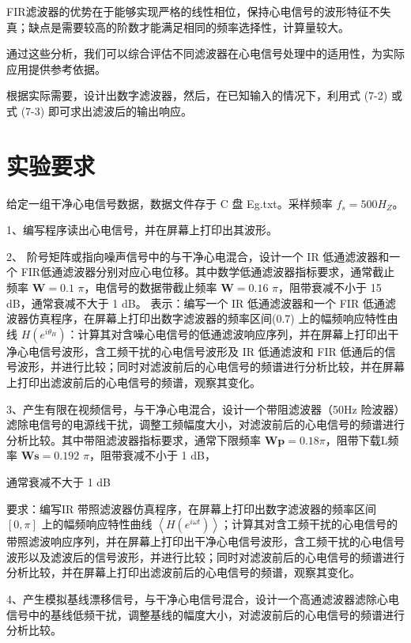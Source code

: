 \documentclass[12pt,hyperref,a4paper,UTF8]{ctexart}
\begin{document}
FIR滤波器的优势在于能够实现严格的线性相位，保持心电信号的波形特征不失真；缺点是需要较高的阶数才能满足相同的频率选择性，计算量较大。


通过这些分析，我们可以综合评估不同滤波器在心电信号处理中的适用性，为实际应用提供参考依据。

根据实际需要，设计出数字滤波器，然后，在已知输入的情况下，利用式 (7-2) 或式 (7-3) 即可求出滤波后的输出响应。

\section{实验要求}

给定一组干净心电信号数据，数据文件存于 C 盘 Eg.txt。采样频率 \(f_s = 500 H_Z\)。

1、编写程序读出心电信号，并在屏幕上打印出其波形。

2、 阶号矩阵或指向噪声信号中的与干净心电混合，设计一个 IR 低通滤波器和一个 FIR低通滤波器分别对应心电位移。其中数学低通滤波器指标要求，通常截止频率 \(\mathbf{W} = 0.1\) \(\pi\)，电信号的数据带截止频率 \(\mathbf{W} = 0.16\) \(\pi\)，阻带衰减不小于 15 dB，通常衰减不大于 1 dB。
表示：编写一个 IR 低通滤波器和一个 FIR 低通滤波器仿真程序，在屏幕上打印出数字滤波器的频率区间(0.7) 上的幅频响应特性由线 \(H(e^{i\theta_H})\)：计算其对含噪心电信号的低通滤波响应序列，并在屏幕上打印出干净心电信号波形，含工频干扰的心电信号波形及 IR 低通滤波和 FIR 低通后的信号波形，并进行比较；同时对滤波前后的心电信号的频谱进行分析比较，并在屏幕上打印出滤波前后的心电信号的频谱，观察其变化。

3、产生有限在视频信号，与干净心电混合，设计一个带阻滤波器（50Hz 险波器）滤除电信号的电源线干扰，调整工频幅度大小，对滤波前后的心电信号的频谱进行分析比较。其中带阻滤波器指标要求，通常下限频率 \(\mathbf{W} \mathbf{p} = 0.18 \pi\)，阻带下载L频率 \(\mathbf{W} \mathbf{s} = 0.192\)  \(\pi\)，阻带衰减不小于 1 dB，

通常衰减不大于 1 dB

要求：编写IR 带照滤波器仿真程序，在屏幕上打印出数字滤波器的频率区间 \([0,\pi]\) 上的幅频响应特性曲线 \(\left<H(e^{i\omega t})\right>\)；计算其对含工频干扰的心电信号的带照滤波响应序列，并在屏幕上打印出干净心电信号波形，含工频干扰的心电信号波形以及滤波后的信号波形，并进行比较；同时对滤波前后的心电信号的频谱进行分析比较，并在屏幕上打印出滤波前后的心电信号的频谱，观察其变化。

4、产生模拟基线漂移信号，与干净心电信号混合，设计一个高通滤波器滤除心电信号中的基线低频干扰，调整基线的幅度大小，对滤波前后的心电信号的频谱进行分析比较。
\end{document}
